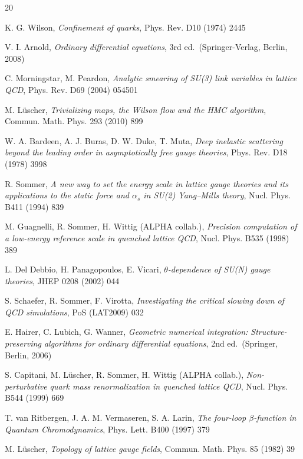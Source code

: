 \begin{thebibliography}{20}

K. G. Wilson, \textit{Confinement of quarks},
Phys. Rev. D10 (1974) 2445

V. I. Arnold,
\textit{Ordinary differential equations}, 3rd ed.\ (Springer-Verlag, Berlin, 2008)

C. Morningstar, M. Peardon,
\textit{Analytic smearing of SU(3) link variables in lattice QCD},
Phys. Rev. D69 (2004) 054501

M. L\"uscher,
\textit{Trivializing maps, the Wilson flow and the HMC algorithm},
Commun. Math. Phys. 293 (2010) 899

W. A. Bardeen, A. J. Buras, D. W. Duke, T. Muta,
\textit{Deep inelastic scattering beyond the leading order
in asymptotically free gauge theories},
Phys. Rev. D18 (1978) 3998

R. Sommer,
\textit{A new way to set the energy scale in lattice gauge theories
and its applications to the static force and $\alpha_s$ in
SU(2) Yang--Mills theory},
Nucl. Phys. B411 (1994) 839

M. Guagnelli, R. Sommer, H. Wittig (ALPHA collab.),
\textit{Precision computation of a low-energy reference scale in
quenched lattice QCD},
Nucl. Phys. B535 (1998) 389

L. Del Debbio, H. Panagopoulos, E. Vicari,
\textit{$\theta$-dependence of SU(N) gauge theories},
JHEP 0208 (2002) 044

S. Schaefer, R. Sommer, F. Virotta,
\textit{Investigating the critical slowing down of QCD simulations},
PoS (LAT2009) 032

E. Hairer, C. Lubich, G. Wanner,
\textit{Geometric numerical integration:
Structure-preserving algorithms for ordinary differential equations},
2nd ed.\ (Springer, Berlin, 2006)

S. Capitani, M. L\"uscher, R. Sommer, H. Wittig (ALPHA collab.),
\textit{Non-perturbative quark mass renormalization in quenched lattice QCD},
Nucl. Phys. B544 (1999) 669

T. van Ritbergen, J. A. M. Vermaseren, S. A. Larin,
\textit{The four-loop $\beta$-function in Quantum Chromodynamics},
Phys. Lett. B400 (1997) 379

M. L\"uscher,
\textit{Topology of lattice gauge fields},
Commun. Math. Phys. 85 (1982) 39


\end{thebibliography}
